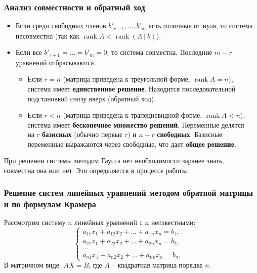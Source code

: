 \documentclass[10pt]{article}
\begin{document}
\subsubsection*{Анализ совместности и обратный ход}

\begin{itemize}
    \item Если среди свободных членов \(b'_{r+1}, \dots, b'_m\) есть отличные от нуля, то система несовместна (так как \(\operatorname{rank} A < \operatorname{rank} (A \: | \: b)\)).
    \item Если все \(b'_{r+1} = \dots = b'_m = 0\), то система совместна. Последние \(m-r\) уравнений отбрасываются.
    \begin{itemize}
        \item Если \(r = n\) (матрица приведена к треугольной форме,  \(\operatorname{rank} A = n\)), система имеет \textbf{единственное решение}. Находится последовательной подстановкой снизу вверх (обратный ход).
        \item Если \(r < n\) (матрица приведена к трапециевидной форме, \(\operatorname{rank} A < n\)), система имеет \textbf{бесконечное множество решений}. Переменные делятся на \(r\) \textbf{базисных} (обычно первые \(r\)) и \(n-r\) \textbf{свободных}. Базисные переменные выражаются через свободные, что дает \textbf{общее решение}.
    \end{itemize}
\end{itemize}

\begin{remark}
При решении системы методом Гаусса нет необходимости заранее знать, совместна она или нет. Это определяется в процессе работы.
\end{remark}

\subsubsection*{Решение систем линейных уравнений методом обратной матрицы и по формулам Крамера}

Рассмотрим систему \(n\) линейных уравнений с \(n\) неизвестными:
\begin{equation} \label{eq:square_system}
\begin{cases}
a_{11}x_1 + a_{12}x_2 + \dots + a_{1n}x_n = b_1, \\
a_{21}x_1 + a_{22}x_2 + \dots + a_{2n}x_n = b_2, \\
\dots \\
a_{n1}x_1 + a_{n2}x_2 + \dots + a_{nn}x_n = b_n.
\end{cases}
\end{equation}
В матричном виде: \(AX = B\), где \(A\) – квадратная матрица порядка \(n\).
\end{document}
